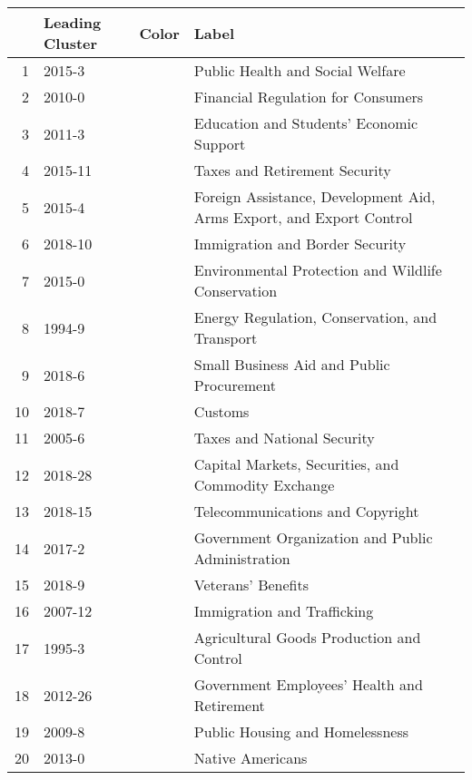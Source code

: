 \bgroup
\def\arraystretch{1.5}
\begin{tabular}{r|p{}cp{}}
	&\textbf{Leading Cluster}&\textbf{Color}&\textbf{Label}\\\hline
	1&2015-3&\colorbox{tab1}{\makebox[2em]{\strut}}&Public Health and Social Welfare\\
	2&2010-0&\colorbox{tab4}{\makebox[2em]{\strut}}&Financial Regulation for Consumers\\
	3&2011-3&\colorbox{tab3}{\makebox[2em]{\strut}}&Education and Students' Economic Support\\
	4&2015-11&\colorbox{tab2}{\makebox[2em]{\strut}}&Taxes and Retirement Security\\
	5&2015-4&\colorbox{tab7}{\makebox[2em]{\strut}}&Foreign Assistance, Development Aid, Arms Export, and Export Control\\
	6&2018-10&\colorbox{tab15}{\makebox[2em]{\strut}}&Immigration and Border Security\\
	7&2015-0&\colorbox{tab5}{\makebox[2em]{\strut}}&Environmental Protection and Wildlife Conservation\\
	8&1994-9&\colorbox{tab12}{\makebox[2em]{\strut}}&Energy Regulation, Conservation, and Transport\\
	9&2018-6&\colorbox{tab13}{\makebox[2em]{\strut}}&Small Business Aid and Public Procurement\\
	10&2018-7&\colorbox{tab8}{\makebox[2em]{\strut}}&Customs\\
	11&2005-6&\colorbox{tab19}{\makebox[2em]{\strut}}&Taxes and National Security\\
	12&2018-28&\colorbox{tab10}{\makebox[2em]{\strut}}&Capital Markets, Securities, and Commodity Exchange\\
	13&2018-15&\colorbox{tab16}{\makebox[2em]{\strut}}&Telecommunications and Copyright\\
	14&2017-2&\colorbox{tab20}{\makebox[2em]{\strut}}&Government Organization and Public Administration\\
	15&2018-9&\colorbox{tab17}{\makebox[2em]{\strut}}&Veterans' Benefits\\
	16&2007-12&\colorbox{tab11}{\makebox[2em]{\strut}}&Immigration and Trafficking\\
	17&1995-3&\colorbox{tab14}{\makebox[2em]{\strut}}&Agricultural Goods Production and Control\\
	18&2012-26&\colorbox{tab18}{\makebox[2em]{\strut}}&Government Employees' Health and Retirement\\
	19&2009-8&\colorbox{tab6}{\makebox[2em]{\strut}}&Public Housing and Homelessness\\
	20&2013-0&\colorbox{tab9}{\makebox[2em]{\strut}}&Native Americans\\
\end{tabular}
\egroup